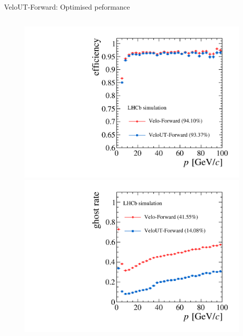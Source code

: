 \documentclass[aspectratio=1610]{beamer}
\begin{document}
\begin{frame}{VeloUT-Forward: Optimised peformance}
\begin{columns}
\begin{column}{0.35\textwidth}
\centering
\begin{figure}
\vspace*{-1cm}
\includegraphics[height=0.475\textheight]{figs/upstream-tracking-upgrade/fwd_eff_p_comp.pdf}\\
\includegraphics[height=0.475\textheight]{figs/upstream-tracking-upgrade/fwd_gr_p_comp.pdf}
\end{figure}
\end{column}
\end{columns}

\end{frame}
\end{document}
